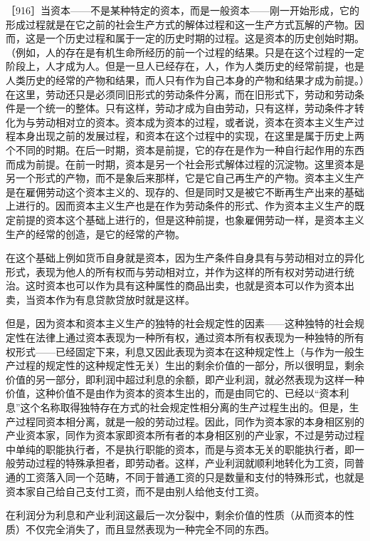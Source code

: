 ［916］当资本——不是某种特定的资本，而是一般资本——刚一开始形成，它的形成过程就是在它之前的社会生产方式的解体过程和这一生产方式瓦解的产物。因而，这是一个历史过程和属于一定的历史时期的过程。这是资本的历史创始时期。（例如，人的存在是有机生命所经历的前一个过程的结果。只是在这个过程的一定阶段上，人才成为人。但是一旦人已经存在，人，作为人类历史的经常前提，也是人类历史的经常的产物和结果，而人只有作为自己本身的产物和结果才成为前提。）在这里，劳动还只是必须同旧形式的劳动条件分离，而在旧形式下，劳动和劳动条件是一个统一的整体。只有这样，劳动才成为自由劳动，只有这样，劳动条件才转化为与劳动相对立的资本。资本成为资本的过程，或者说，资本在资本主义生产过程本身出现之前的发展过程，和资本在这个过程中的实现，在这里是属于历史上两个不同的时期。在后一时期，资本是前提，它的存在是作为一种自行起作用的东西而成为前提。在前一时期，资本是另一个社会形式解体过程的沉淀物。这里资本是另一个形式的产物，而不是象后来那样，它是它自己再生产的产物。资本主义生产是在雇佣劳动这个资本主义的、现存的、但是同时又是被它不断再生产出来的基础上进行的。因而资本主义生产也是在作为劳动条件的形式、作为资本主义生产的既定前提的资本这个基础上进行的，但是这种前提，也象雇佣劳动一样，是资本主义生产的经常的创造，是它的经常的产物。

在这个基础上例如货币自身就是资本，因为生产条件自身具有与劳动相对立的异化形式，表现为他人的所有权而与劳动相对立，并作为这样的所有权对劳动进行统治。这时资本也可以作为具有这种属性的商品出卖，也就是资本可以作为资本出卖，当资本作为有息贷款贷放时就是这样。

但是，因为资本和资本主义生产的独特的社会规定性的因素——这种独特的社会规定性在法律上通过资本表现为一种所有权，通过资本所有权表现为一种独特的所有权形式——已经固定下来，利息又因此表现为资本在这种规定性上（与作为一般生产过程的规定性的这种规定性无关）生出的剩余价值的一部分，所以很明显，剩余价值的另一部分，即利润中超过利息的余额，即产业利润，就必然表现为这样一种价值，这种价值不是由作为资本的资本生出的，而是由同它的、已经以“资本利息”这个名称取得独特存在方式的社会规定性相分离的生产过程生出的。但是，生产过程同资本相分离，就是一般的劳动过程。因此，同作为资本家的本身相区别的产业资本家，同作为资本家即资本所有者的本身相区别的产业家，不过是劳动过程中单纯的职能执行者，不是执行职能的资本，而是与资本无关的职能执行者，即一般劳动过程的特殊承担者，即劳动者。这样，产业利润就顺利地转化为工资，同普通的工资落入同一个范畴，不同于普通工资的只是数量和支付的特殊形式，也就是资本家自己给自己支付工资，而不是由别人给他支付工资。

在利润分为利息和产业利润这最后一次分裂中，剩余价值的性质（从而资本的性质）不仅完全消失了，而且显然表现为一种完全不同的东西。

